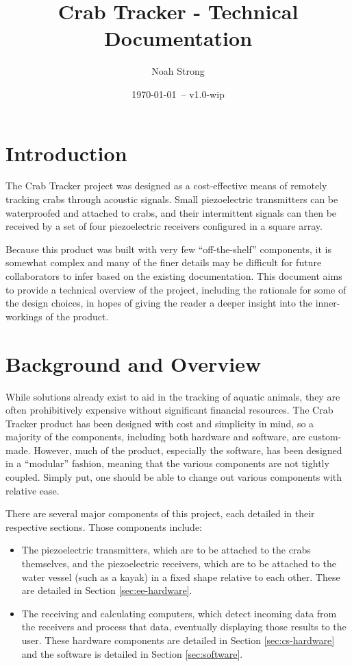 \documentclass[12pt]{article}
\title{Crab Tracker - Technical Documentation}
\author{
	Noah Strong
}
\date{\today\ -- v1.0-wip}
\begin{document}
\maketitle

\tableofcontents{}

\section{Introduction}

The Crab Tracker project was designed as a cost-effective means of remotely
tracking crabs through acoustic signals.
Small piezoelectric transmitters can be waterproofed and attached to crabs,
and their intermittent signals can then be received by a set of four
piezoelectric receivers configured in a square array.

Because this product was built with very few ``off-the-shelf'' components,
it is somewhat complex and many of the finer details may be difficult for
future collaborators to infer based on the existing documentation.
This document aims to provide a technical overview of the project, including
the rationale for some of the design choices, in hopes of giving the reader
a deeper insight into the inner-workings of the product.

\section{Background and Overview}

While solutions already exist to aid in the tracking of aquatic animals,
they are often prohibitively expensive without significant financial resources.
The Crab Tracker product has been designed with cost and simplicity in mind,
so a majority of the components, including both hardware and software, are
custom-made.
However, much of the product, especially the software, has been designed
in a ``modular'' fashion, meaning that the various components are not tightly
coupled.
Simply put, one should be able to change out various components with relative
ease.

There are several major components of this project, each detailed in their
respective sections. Those components include:
\begin{itemize}
	\item The piezoelectric transmitters, which are to be attached to the
	      crabs themselves, and the piezoelectric receivers, which are to
	      be attached to the water vessel (such as a kayak) in a fixed shape
	      relative to each other. These are detailed in
	      Section \ref{sec:ee-hardware}.
	\item The receiving and calculating computers, which detect incoming
	      data from the receivers and process that data, eventually displaying
	      those results to the user.
	      These hardware components are detailed in
	      Section \ref{sec:cs-hardware} and the software is detailed in
	      Section \ref{sec:software}.
\end{itemize}
\end{document}
